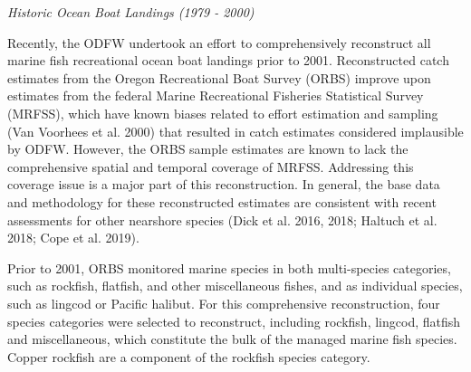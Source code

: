 \documentclass[11pt,
  english,
  a4paper,
]{article}
\begin{document}
\emph{Historic Ocean Boat Landings (1979 - 2000)}

\leavevmode\tagmcend\tagstructend\par


Recently, the ODFW undertook an effort to comprehensively reconstruct all marine fish recreational ocean boat landings prior to 2001. Reconstructed catch estimates from the Oregon Recreational Boat Survey (ORBS) improve upon estimates from the federal Marine Recreational Fisheries Statistical Survey (MRFSS), which have known biases related to effort estimation and sampling {(Van Voorhees et al. 2000)\leavevmode\tagmcend\tagstructend} that resulted in catch estimates considered implausible by ODFW. However, the ORBS sample estimates are known to lack the comprehensive spatial and temporal coverage of MRFSS. Addressing this coverage issue is a major part of this reconstruction. In general, the base data and methodology for these reconstructed estimates are consistent with recent assessments for other nearshore species {(Dick et al. 2016, 2018; Haltuch et al. 2018; Cope et al. 2019)\leavevmode\tagmcend\tagstructend}.

\leavevmode\tagmcend\tagstructend\par


Prior to 2001, ORBS monitored marine species in both multi-species categories, such as rockfish, flatfish, and other miscellaneous fishes, and as individual species, such as lingcod or Pacific halibut. For this comprehensive reconstruction, four species categories were selected to reconstruct, including rockfish, lingcod, flatfish and miscellaneous, which constitute the bulk of the managed marine fish species. Copper rockfish are a component of the rockfish species category.

\leavevmode\tagmcend\tagstructend\par

\end{document}
